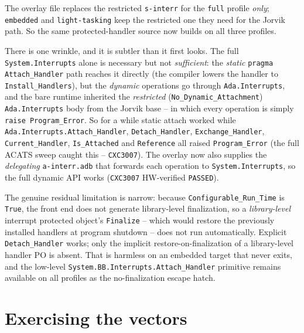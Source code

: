 The overlay file replaces the restricted \texttt{s-interr} for the \texttt{full}
profile \emph{only}; \texttt{embedded} and \texttt{light-tasking} keep the
restricted one they need for the Jorvik path. So the same protected-handler
source now builds on all three profiles.

There is one wrinkle, and it is subtler than it first looks. The full
\texttt{System.Interrupts} alone is necessary but not \emph{sufficient}: the
\emph{static} \texttt{pragma Attach\_Handler} path reaches it directly (the
compiler lowers the handler to \texttt{Install\_Handlers}), but the \emph{dynamic}
operations go through \texttt{Ada.Interrupts}, and the bare runtime inherited the
\emph{restricted} (\texttt{No\_Dynamic\_Attachment}) \texttt{Ada.Interrupts} body
from the Jorvik base -- in which every operation is simply \texttt{raise
Program\_Error}. So for a while static attach worked while
\texttt{Ada.Interrupts.Attach\_Handler}, \texttt{Detach\_Handler},
\texttt{Exchange\_Handler}, \texttt{Current\_Handler}, \texttt{Is\_Attached} and
\texttt{Reference} all raised \texttt{Program\_Error} (the full ACATS sweep caught
this -- \texttt{CXC3007}). The overlay now also supplies the \emph{delegating}
\texttt{a-interr.adb} that forwards each operation to \texttt{System.Interrupts},
so the full dynamic API works (\texttt{CXC3007} HW-verified \texttt{PASSED}).

The genuine residual limitation is narrow: because \texttt{Configurable\_Run\_Time}
is \texttt{True}, the front end does not generate library-level finalization, so a
\emph{library-level} interrupt protected object's \texttt{Finalize} -- which would
restore the previously installed handlers at program shutdown -- does not run
automatically. Explicit \texttt{Detach\_Handler} works; only the implicit
restore-on-finalization of a library-level handler PO is absent. That is harmless
on an embedded target that never exits, and the low-level
\texttt{System.BB.Interrupts.Attach\_Handler} primitive remains available on all
profiles as the no-finalization escape hatch.

\section{Exercising the vectors}

